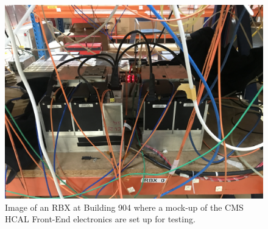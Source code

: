 \begin{figure}[!htb]
	\centering
	\includegraphics[scale=0.07]{fig/RBXBurn-in.jpg}
	\caption{Image of an RBX at Building 904 where a mock-up of the CMS HCAL Front-End electronics are set up for testing.}
	\label{fig:RBXBurnin904}
\end{figure}



